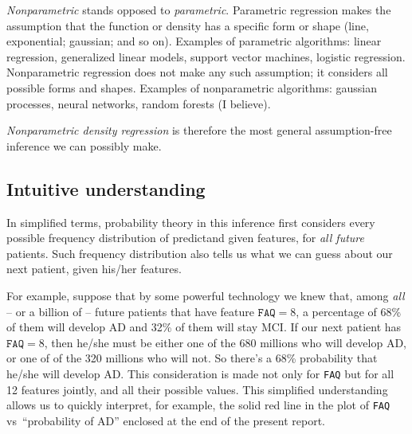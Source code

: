 \documentclass[\ifafour a4paper,12pt,\else a5paper,10pt,\fi%
onecolumn,oneside,article,%
british%
]{memoir}
\theoremstyle{remark}
\theoremstyle{innote}
\renewcommand*{\|}[1][]{\nonscript\:#1\vert\nonscript\:\mathopen{}}
\newcommand*{\vs}{{vs}}
\begin{document}
\emph{Nonparametric} stands opposed to \emph{parametric}. Parametric
regression makes the assumption that the function or density has a specific
form or shape (line, exponential; gaussian; and so on). Examples of
parametric algorithms: linear regression, generalized linear models,
support vector machines, logistic regression. Nonparametric regression does
not make any such assumption; it considers all possible forms and shapes.
Examples of nonparametric algorithms: gaussian processes, neural networks,
random forests (I believe).

\emph{Nonparametric density regression} is therefore the most general
assumption-free inference we can possibly make.

\subsection{Intuitive understanding}
\label{sec:understand}

In simplified terms, probability theory in this inference first considers
every possible frequency distribution of predictand given features, for
\emph{all future} patients. Such frequency distribution also tells us what
we can guess about our next patient, given his/her features.

For example, suppose that by some powerful technology we knew that, among
\emph{all} -- or a billion of -- future patients that have feature
$\texttt{FAQ}=8$, a percentage of 68\% of them will develop AD and 32\% of
them will stay MCI. If our next patient has $\texttt{FAQ}=8$, then he/she
must be either one of the 680 millions who will develop AD, or one of of
the 320 millions who will not. So there's a 68\% probability that he/she
will develop AD. This consideration is made not only for \texttt{FAQ} but
for all 12 features jointly, and all their possible values. This simplified
understanding allows us to quickly interpret, for example, the solid red
line in the plot of \texttt{FAQ} \vs\ \enquote{probability of AD} enclosed
at the end of the present report.

\smallskip
\end{document}
